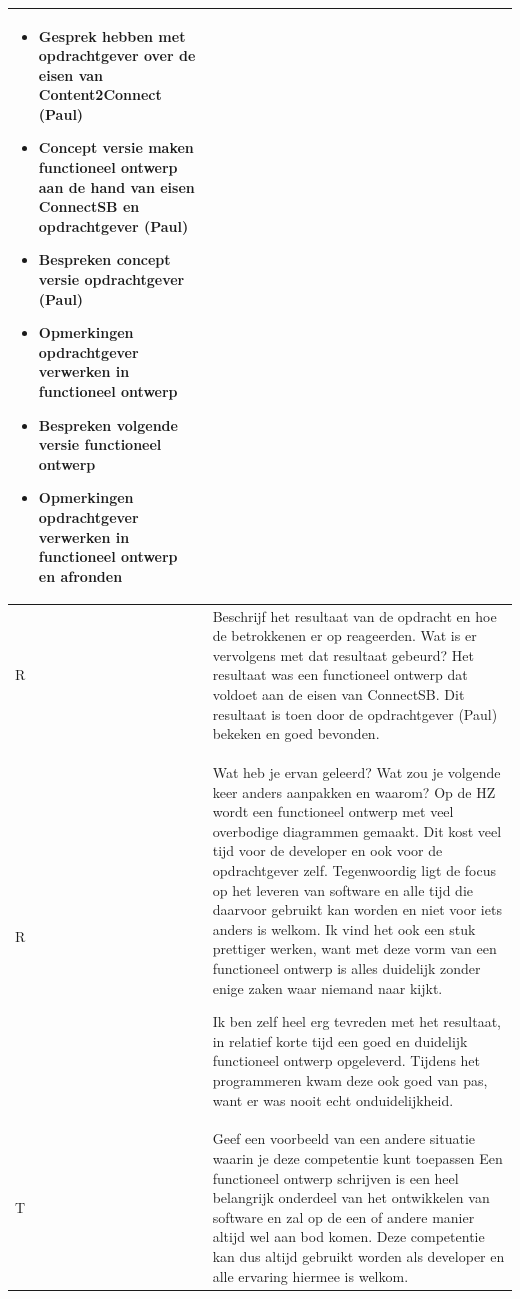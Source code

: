 \begin{tabularx}{\textwidth}{| l | X |}
\begin{itemize}
\item Gesprek hebben met opdrachtgever over de eisen van Content2Connect (Paul)
\item Concept versie maken functioneel ontwerp aan de hand van eisen ConnectSB en opdrachtgever (Paul)
\item Bespreken concept versie opdrachtgever (Paul)
\item Opmerkingen opdrachtgever verwerken in functioneel ontwerp
\item Bespreken volgende versie functioneel ontwerp
\item Opmerkingen opdrachtgever verwerken in functioneel ontwerp en afronden
\end{itemize}
\\
\hline
R & Beschrijf het resultaat van de opdracht en hoe de betrokkenen er op reageerden. Wat is er vervolgens met dat resultaat gebeurd?
\newline
\newline
Het resultaat was een functioneel ontwerp dat voldoet aan de eisen van ConnectSB. Dit resultaat is toen door de opdrachtgever (Paul) bekeken en goed bevonden.
\\
\hline
R & Wat heb je ervan geleerd? Wat zou je volgende keer anders aanpakken en waarom?
\newline
\newline
Op de HZ wordt een functioneel ontwerp met veel overbodige diagrammen gemaakt. Dit kost veel tijd voor de developer en ook voor de opdrachtgever zelf. Tegenwoordig ligt de focus op het leveren van software en alle tijd die daarvoor gebruikt kan worden en niet voor iets anders is welkom. Ik vind het ook een stuk prettiger werken, want met deze vorm van een functioneel ontwerp is alles duidelijk zonder enige zaken waar niemand naar kijkt.

\newline
Ik ben zelf heel erg tevreden met het resultaat, in relatief korte tijd een goed en duidelijk functioneel ontwerp opgeleverd. Tijdens het programmeren kwam deze ook goed van pas, want er was nooit echt onduidelijkheid.
\\
\hline
T & Geef een voorbeeld van een andere situatie waarin je deze competentie kunt toepassen
\newline
\newline
Een functioneel ontwerp schrijven is een heel belangrijk onderdeel van het ontwikkelen van software en zal op de een of andere manier altijd wel aan bod komen. Deze competentie kan dus altijd gebruikt worden als developer en alle ervaring hiermee is welkom.
\\
\hline
\end{tabularx}

